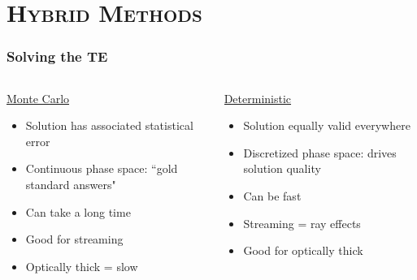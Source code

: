 \documentclass[xcolor=x11names,compress]{beamer}
\renewcommand{\(}{\begin{columns}}
\renewcommand{\)}{\end{columns}}
\newcommand{\<}[1]{\begin{column}{#1}}
\renewcommand{\>}{\end{column}}
\begin{document}
\section{\scshape Hybrid Methods}
\begin{frame}[fragile]
  \frametitle{Solving the TE}

\begin{columns}
  \begin{column}{0.5\textwidth}
  \begin{center}
  \underline{Monte Carlo}
  \end{center}
	\begin{itemize}
	\item Solution has associated statistical error
	\item Continuous phase space: ``gold standard answers"
	\item Can take a long time
	\item Good for streaming
	\item Optically thick = slow
	\end{itemize}
  \end{column}
  \begin{column}{0.5\textwidth}
  \begin{center}
  \underline{Deterministic}
  \end{center}
	\begin{itemize}
	\item Solution equally valid everywhere
	\item Discretized phase space: drives solution quality
	\item Can be fast
	\item Streaming = ray effects
	\item Good for optically thick
	\end{itemize}
  \end{column}
\end{columns}

\end{frame}
\end{document}
